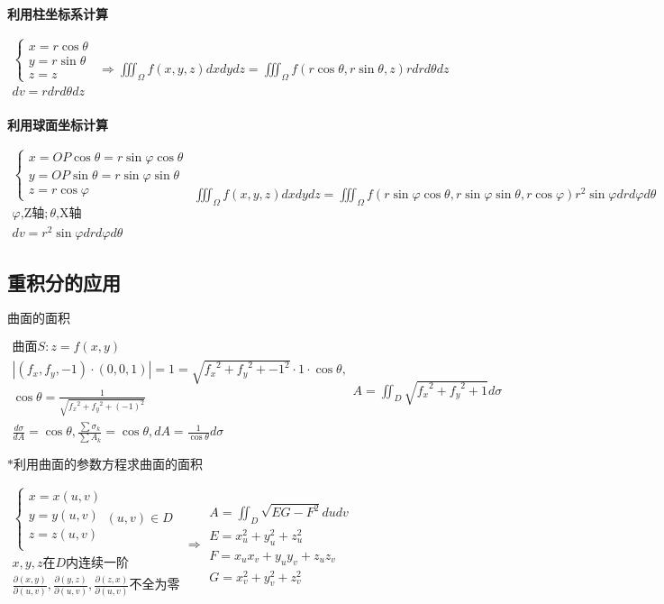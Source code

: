 \documentclass[UTF8]{ctexart}
\newcommand{\mt}[1]{\text{#1}}
\newcommand{\mb}[1]{\textbf{#1}}
\newcommand{\mf}[1]{\left( #1\right)}
\newcommand{\mfa}[1]{\left| #1\right|}
\newcommand{\p}{\par}
\newcommand{\ma}[1]{\begin{array}{llll} #1 \end{array}}
\newcommand{\da}[2]{\frac{\partial #1}{\partial #2}}
\newcommand{\fcz}[1] {
    \left\{
        \begin{array}{llll} #1 \end{array}
    \right.
}
\begin{document}
\mb{利用柱坐标系计算}\p
$\ma{\fcz{
    x=r\cos \theta\\
    y=r\sin \theta\\
    z=z
}\\
dv=rdrd\theta dz\\
}\Rightarrow \iiint_{\Omega}f\mf{x,y,z}dxdydz=\iiint_{\Omega}f\mf{r\cos \theta,r\sin \theta,z}rdrd\theta dz$



\mb{利用球面坐标计算}\p
$\ma{
    \fcz{
        x=OP \cos \theta =r \sin \varphi \cos \theta\\
        y=OP \sin \theta =r \sin \varphi \sin \theta\\ 
        z=r \cos \varphi
    } \\
    \varphi \mt{,Z轴}; \theta \mt{,X轴}\\
    dv=r^2\sin \varphi dr d \varphi d\theta
}\iiint_{\Omega}f\mf{x,y,z}dxdydz=\iiint_{\Omega}f\mf{r \sin \varphi \cos \theta,r \sin \varphi \sin \theta,r \cos \varphi}r^2\sin \varphi dr d \varphi d\theta
$


\subsection{重积分的应用}
$\mb{曲面的面积}$\p
$\ma{
    \mt{曲面} S: z=f\mf{x,y}\\
    \mfa{\mf{f_x,f_y,-1}\cdot\mf{0,0,1}}=1=\sqrt{{f_x}^2+{f_y}^2+{-1}^2}\cdot1\cdot\cos\theta,\\
    \cos \theta=\frac{1}{\sqrt{{f_x}^2+{f_y}^2+\mf{-1}^2}}\\
    \frac{d\sigma}{dA}=\cos \theta ,\frac{\sum \sigma_k}{\sum A_k}=\cos \theta,dA=\frac{1}{\cos \theta}d\sigma
}A=\iint_{D}\sqrt{{f_x}^2+{f_y}^2+1 }d\sigma$\p

$\mb{*利用曲面的参数方程求曲面的面积}$\p

$\ma{\fcz{
    x=x\mf{u,v}\\
    y=y\mf{u,v}\\
    z=z\mf{u,v}\\
}\mf{u,v}\in D\\
x,y,z \mt{在}D\mt{内连续一阶}\\
\da{\mf{x,y}}{\mf{u,v}},\da{\mf{y,z}}{\mf{u,v}},\da{\mf{z,x}}{\mf{u,v}}\mt{不全为零}\\
}\Rightarrow \ma{
    A=\iint_D\sqrt{EG-F^2}dudv\\
    E=x_u^2+y_u^2+z_u^2\\
    F=x_ux_v+y_uy_v+z_uz_v\\
    G=x_v^2+y_v^2+z_v^2
}
$
\end{document}
